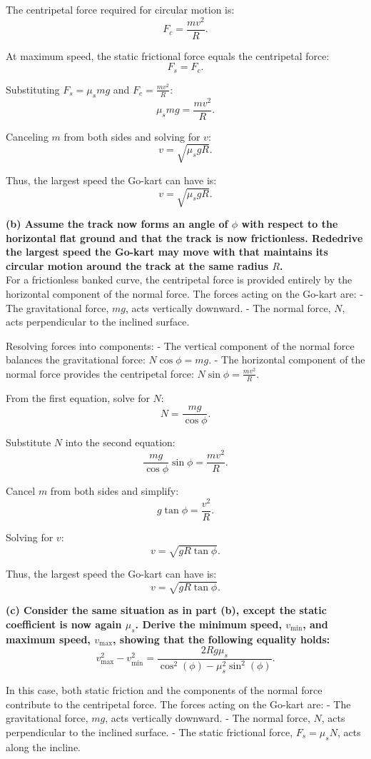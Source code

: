 The centripetal force required for circular motion is:
\[
F_c = \frac{mv^2}{R}.
\]

At maximum speed, the static frictional force equals the centripetal force:
\[
F_s = F_c.
\]

Substituting $F_s = \mu_s mg$ and $F_c = \frac{mv^2}{R}$:
\[
\mu_s mg = \frac{mv^2}{R}.
\]

Canceling $m$ from both sides and solving for $v$:
\[
v = \sqrt{\mu_s g R}.
\]

Thus, the largest speed the Go-kart can have is:
\[
\boxed{v = \sqrt{\mu_s g R}}.
\]

\textbf{(b) Assume the track now forms an angle of $\phi$ with respect to the horizontal flat ground and that the track is now frictionless. Rededrive the largest speed the Go-kart may move with that maintains its circular motion around the track at the same radius $R$.} \\

For a frictionless banked curve, the centripetal force is provided entirely by the horizontal component of the normal force. The forces acting on the Go-kart are:
- The gravitational force, $mg$, acts vertically downward.
- The normal force, $N$, acts perpendicular to the inclined surface.

Resolving forces into components:
- The vertical component of the normal force balances the gravitational force: $N \cos\phi = mg$.
- The horizontal component of the normal force provides the centripetal force: $N \sin\phi = \frac{mv^2}{R}$.

From the first equation, solve for $N$:
\[
N = \frac{mg}{\cos\phi}.
\]

Substitute $N$ into the second equation:
\[
\frac{mg}{\cos\phi} \sin\phi = \frac{mv^2}{R}.
\]

Cancel $m$ from both sides and simplify:
\[
g \tan\phi = \frac{v^2}{R}.
\]

Solving for $v$:
\[
v = \sqrt{gR \tan\phi}.
\]

Thus, the largest speed the Go-kart can have is:
\[
\boxed{v = \sqrt{gR \tan\phi}}.
\]

\textbf{(c) Consider the same situation as in part (b), except the static coefficient is now again $\mu_s$. Derive the minimum speed, $v_{\text{min}}$, and maximum speed, $v_{\text{max}}$, showing that the following equality holds:}
\[
v_{\text{max}}^2 - v_{\text{min}}^2 = \frac{2Rg\mu_s}{\cos^2(\phi) - \mu_s^2\sin^2(\phi)}.
\]

In this case, both static friction and the components of the normal force contribute to the centripetal force. The forces acting on the Go-kart are:
- The gravitational force, $mg$, acts vertically downward.
- The normal force, $N$, acts perpendicular to the inclined surface.
- The static frictional force, $F_s = \mu_s N$, acts along the incline.

